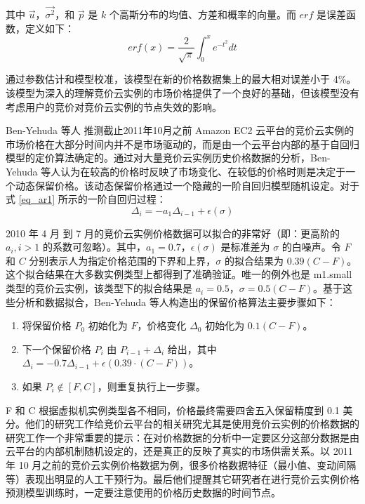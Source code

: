 其中 $\vec u$，$\vec{\sigma^2}$，和 $\vec p$ 是 $k$ 个高斯分布的均值、方差和概率的向量。而 $erf$ 是误差函数，定义如下：
\begin{equation}\label{eq_erf}\nonumber 
erf(x) = \frac{2}{\sqrt{\pi}}\int_{0}^{x} e^{-t^2}dt
\end{equation}

通过参数估计和模型校准，该模型在新的价格数据集上的最大相对误差小于 4\%。该模型为深入的理解竞价云实例的市场价格提供了一个良好的基础，但该模型没有考虑用户的竞价对竞价云实例的节点失效的影响。

Ben-Yehuda 等人 \cite{AgmonBen-Yehuda:2013:DAE:2509413.2509416} 推测截止2011年10月之前 Amazon EC2 云平台的竞价云实例的市场价格在大部分时间内并不是市场驱动的，而是由一个云平台内部的基于自回归模型的定价算法确定的。通过对大量竞价云实例历史价格数据的分析，Ben-Yehuda 等人认为在较高的价格时反映了市场变化、在较低的价格时则是决定于一个动态保留价格。该动态保留价格通过一个隐藏的一阶自回归模型随机设定。对于式 \eqref{eq_ar1} 所示的一阶自回归过程：
\begin{equation}\label{eq_ar1} 
\Delta_i = - a_1\Delta_{i-1}+\epsilon(\sigma)
\end{equation}

2010 年 4 月 到 7 月的竞价云实例价格数据可以拟合的非常好（即：更高阶的 $a_i, i > 1$ 的系数可忽略）。其中，$a_1 = 0.7$，$\epsilon(\sigma)$ 是标准差为 $\sigma$ 的白噪声。令 $F$ 和 $C$ 分别表示人为指定价格范围的下界和上界，$\sigma$ 的拟合结果为 $0.39 (C - F)$。这个拟合结果在大多数实例类型上都得到了准确验证。唯一的例外也是 m1.small 类型的竞价云实例，该类型下的拟合结果是 $a_i = 0.5$，$\sigma = 0.5 (C - F)$。基于这些分析和数据拟合，Ben-Yehuda 等人构造出的保留价格算法主要步骤如下：
\begin{enumerate}
\item 将保留价格 $P_0$ 初始化为 $F$，价格变化 $\Delta_0$ 初始化为 $0.1 (C - F)$。
\item 下一个保留价格 $P_i$ 由 $P_{i-1} + \Delta_i$ 给出，其中 $\Delta_i = - 0.7 \Delta_{i-1}+\epsilon(0.39 \cdot (C - F))$。
\item 如果 $P_i \notin [F, C]$，则重复执行上一步骤。
\end{enumerate}

F 和 C 根据虚拟机实例类型各不相同，价格最终需要四舍五入保留精度到 0.1 美分。他们的研究工作给竞价云平台的相关研究尤其是使用竞价云实例的价格数据的研究工作一个非常重要的提示：在对价格数据的分析中一定要区分这部分数据是由云平台的内部机制随机设定的，还是真正的反映了真实的市场供需关系。以 2011 年 10 月之前的竞价云实例价格数据为例，很多价格数据特征（最小值、变动间隔等）表现出明显的人工干预行为。最后他们提醒其它研究者在进行竞价云实例价格预测模型训练时，一定要注意使用的价格历史数据的时间节点。

